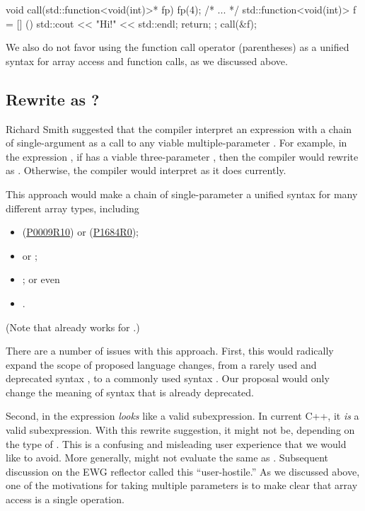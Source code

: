 \documentclass{wg21}
\begin{document}
\begin{colorblock}
void call(std::function<void(int)>* fp) {
    fp(4);
}
/* ... */
std::function<void(int)> f = [] () {
    std::cout << "Hi!" << std::endl;
    return;
};
call(&f);
\end{colorblock}

We also do not favor using the function call operator (parentheses) as a unified syntax for array access and function calls, as we discussed above.

\subsection{Rewrite \tcode{a[x][y]][z]} as ?}

Richard Smith suggested that the compiler interpret an expression with a chain of single-argument  as a call to any viable multiple-parameter .  For example, in the expression , if  has a viable three-parameter , then the compiler would rewrite  as .  Otherwise, the compiler would interpret  as it does currently.  

This approach would make a chain of single-parameter  a unified syntax for many different array types, including

\begin{itemize}
\item {} (\href{wg21.link/p0009r10}{P0009R10}) or  (\href{wg21.link/p1684r0}{P1684R0});
\item {} or ;
\item {}; or even
\item {}.
\end{itemize}

(Note that  already works for .)  

There are a number of issues with this approach.  First, this would radically expand the scope of proposed language changes, from a rarely used and deprecated syntax , to a commonly used syntax .  Our proposal would only change the meaning of syntax that is already deprecated.

Second,  in the expression  \emph{looks} like a valid subexpression.  In current C++, it \emph{is} a valid subexpression.  With this rewrite suggestion, it might not be, depending on the type of .  This is a confusing and misleading user experience that we would like to avoid.  More generally,  might not evaluate the same as .  Subsequent discussion on the EWG reflector called this ``user-hostile.''  As we discussed above, one of the motivations for  taking multiple parameters is to make clear that array access is a single operation.
\end{document}
